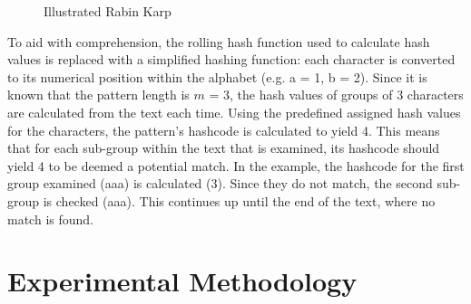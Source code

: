 \documentclass[12pt]{article}
\begin{document}
\begin{figure}
    \centering
    \qquad
    \caption{Illustrated Rabin Karp \parencite{13}}
\end{figure}

To aid with comprehension, the rolling hash function used to calculate hash values is replaced with a simplified hashing function: each character is converted to its numerical position within the alphabet (e.g. a = 1, b = 2). Since it is known that the pattern length is $m$ = 3, the hash values of groups of 3 characters are calculated from the text each time. Using the predefined assigned hash values for the characters, the pattern's hashcode is calculated to yield 4. This means that for each sub-group within the text that is examined, its hashcode should yield 4 to be deemed a potential match. In the example, the hashcode for the first group examined (aaa) is calculated (3). Since they do not match, the second sub-group is checked (aaa). This continues up until the end of the text, where no match is found.

\section{Experimental Methodology}
\end{document}
